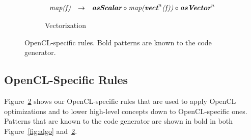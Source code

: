 \begin{figure}[t]
\vspace{\ruleSpace}
\begin{subfigure}[b]{1\linewidth}
\begin{mdframed}
$$
\begin{array}{lrll}
\textit{map(f)} & \rightarrow & \textit{\textbf{asScalar}} \circ \textit{map(\textbf{vect}}^n\textit{(f))} \circ \textit{\textbf{asVector}}^n
\end{array}
$$
\end{mdframed}
  \caption{Vectorization}
   \label{fig:algo:vect}
\end{subfigure}

\vspace{-2em}
\caption{OpenCL-specific rules. Bold patterns are known to the code generator.}
\label{fig:low}
\end{figure}





\subsection{OpenCL-Specific Rules}

Figure~\ref{fig:low} shows our OpenCL-specific rules that are used to apply OpenCL optimizations and to lower high-level concepts down to OpenCL-specific ones.
Patterns that are known to the code generator are shown in bold in both Figure~\ref{fig:algo} and~\ref{fig:low}.


